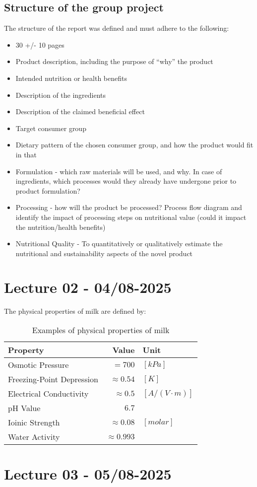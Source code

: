 \subsection*{Structure of the group project}
The structure of the report was defined and must adhere to the following:
\begin{itemize}
    \item 30 +/- 10 pages
    \item Product description, including the purpose of “why” the product
    \item Intended nutrition or health benefits
    \item Description of the ingredients
    \item Description of the claimed beneficial effect
    \item Target consumer group
    \item Dietary pattern of the chosen consumer group, and how the product would fit in that
    \item Formulation - which raw materials will be used, and why. In case of ingredients, which processes would they already have undergone prior to product formulation?
    \item Processing - how will the product be processed? Process flow diagram and identify the impact of processing steps on nutritional value (could it impact the nutrition/health benefits)
    \item Nutritional Quality - To quantitatively or qualitatively estimate the nutritional and sustainability aspects of the novel product
\end{itemize}

\section{Lecture 02 - 04/08-2025}

The physical properties of milk are defined by:
\begin{table}[h]
    \centering
    \caption{Examples of physical properties of milk}
    \label{tab:milk_physical_properties}
    \begin{tabular}{ l  r l }
        \textbf{Property} & \textbf{Value} & \textbf{Unit}\\ 
        \hline
        Osmotic Pressure & $= 700$  & $[kPa]$ \\ 

        Freezing-Point Depression & $\approx 0.54$ & $[K]$ \\

        Electrical Conductivity & $\approx 0.5$ & $[A/(V \cdot m)]$ \\ 

        pH Value & $6.7$ & \\

        Ioinic Strength & $\approx 0.08$ & $[molar]$ \\

        Water Activity & $\approx 0.993$ & \\

    \end{tabular}
\end{table}

\section{Lecture 03 - 05/08-2025}




